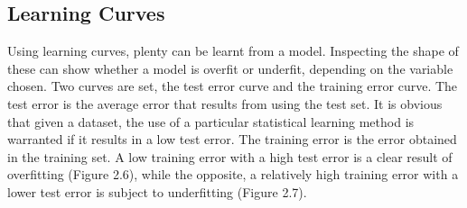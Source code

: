 \subsection{Learning Curves}
Using learning curves, plenty can be learnt from a model. Inspecting the shape of these can show whether a model is overfit or underfit, depending on the variable chosen. Two curves are set, the test error curve and the training error curve. The test error is the average error that results from using the test set. It is obvious that given a dataset, the use of a particular statistical learning method is warranted if it results in a low test error. The training error is the error obtained in the training set. A low training error with a high test error is a clear result of overfitting (Figure 2.6), while the opposite, a relatively high training error with a lower test error is subject to underfitting (Figure 2.7).
